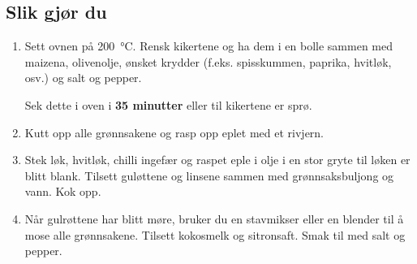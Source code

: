 \subsection*{Slik gjør du}

\begin{enumerate}
    \item
    Sett ovnen på \SI{200}{\celsius}.
    Rensk kikertene og ha dem i en bolle sammen med maizena, olivenolje, ønsket krydder (f.eks. spisskummen, paprika, hvitløk, osv.) og salt og pepper.
    
    Sek dette i oven i \textbf{35 minutter} eller til kikertene er sprø.
    
    \item 
    Kutt opp alle grønnsakene og rasp opp eplet med et rivjern.
    
    \item
    Stek løk, hvitløk, chilli ingefær og raspet eple i olje i en stor gryte til løken er blitt blank. 
    Tilsett guløttene og linsene sammen med grønnsaksbuljong og vann. 
    Kok opp.
    
    \item
    Når gulrøttene har blitt møre, bruker du en stavmikser eller en blender til å mose alle grønnsakene.
    Tilsett kokosmelk og sitronsaft.
    Smak til med salt og pepper.
    
\end{enumerate}